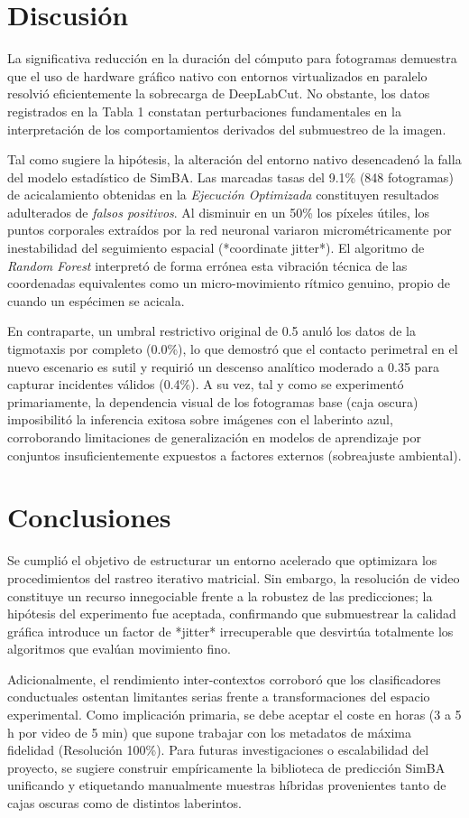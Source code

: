 \documentclass[12pt,a4paper]{article}
\begin{document}
\section{Discusión}
La significativa reducción en la duración del cómputo para fotogramas demuestra que el uso de hardware gráfico nativo con entornos virtualizados en paralelo resolvió eficientemente la sobrecarga de DeepLabCut. No obstante, los datos registrados en la Tabla 1 constatan perturbaciones fundamentales en la interpretación de los comportamientos derivados del submuestreo de la imagen.

Tal como sugiere la hipótesis, la alteración del entorno nativo desencadenó la falla del modelo estadístico de SimBA. Las marcadas tasas del 9.1\% (848 fotogramas) de acicalamiento obtenidas en la \textit{Ejecución Optimizada} constituyen resultados adulterados de \textit{falsos positivos}. Al disminuir en un 50\% los píxeles útiles, los puntos corporales extraídos por la red neuronal variaron micrométricamente por inestabilidad del seguimiento espacial (*coordinate jitter*). El algoritmo de \textit{Random Forest} interpretó de forma errónea esta vibración técnica de las coordenadas equivalentes como un micro-movimiento rítmico genuino, propio de cuando un espécimen se acicala.

En contraparte, un umbral restrictivo original de 0.5 anuló los datos de la tigmotaxis por completo (0.0\%), lo que demostró que el contacto perimetral en el nuevo escenario es sutil y requirió un descenso analítico moderado a 0.35 para capturar incidentes válidos (0.4\%). A su vez, tal y como se experimentó primariamente, la dependencia visual de los fotogramas base (caja oscura) imposibilitó la inferencia exitosa sobre imágenes con el laberinto azul, corroborando limitaciones de generalización en modelos de aprendizaje por conjuntos insuficientemente expuestos a factores externos (sobreajuste ambiental).

\section{Conclusiones}
Se cumplió el objetivo de estructurar un entorno acelerado que optimizara los procedimientos del rastreo iterativo matricial. Sin embargo, la resolución de video constituye un recurso innegociable frente a la robustez de las predicciones; la hipótesis del experimento fue aceptada, confirmando que submuestrear la calidad gráfica introduce un factor de *jitter* irrecuperable que desvirtúa totalmente los algoritmos que evalúan movimiento fino. 

Adicionalmente, el rendimiento inter-contextos corroboró que los clasificadores conductuales ostentan limitantes serias frente a transformaciones del espacio experimental. Como implicación primaria, se debe aceptar el coste en horas (3 a 5 h por video de 5 min) que supone trabajar con los metadatos de máxima fidelidad (Resolución 100\%). Para futuras investigaciones o escalabilidad del proyecto, se sugiere construir empíricamente la biblioteca de predicción SimBA unificando y etiquetando manualmente muestras híbridas provenientes tanto de cajas oscuras como de distintos laberintos.
\end{document}
